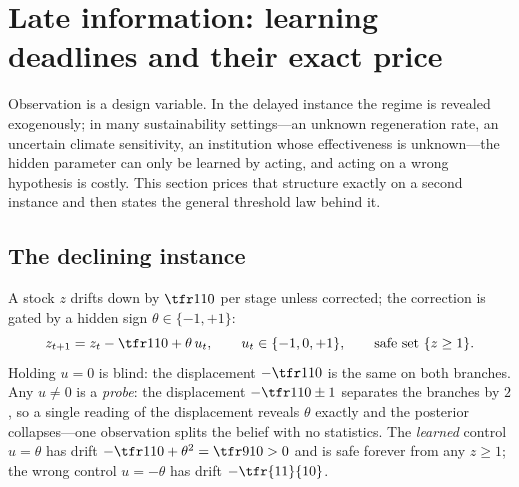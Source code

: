 \section{Late information: learning deadlines and their exact price}\label{sec:deadline}

Observation is a design variable. In the delayed instance the regime is revealed exogenously; in many sustainability settings---an unknown regeneration rate, an uncertain climate sensitivity, an institution whose effectiveness is unknown---the hidden parameter can only be learned by acting, and acting on a wrong hypothesis is costly. This section prices that structure exactly on a second instance and then states the general threshold law behind it.

\subsection{The declining instance}

A stock $z$ drifts down by $\tfr1{10}$ per stage unless corrected; the correction is gated by a hidden sign $\theta\in\{-1,+1\}$:
\begin{equation}\label{eq:declining}
z_{t+1}=z_t-\tfr1{10}+\theta\,u_t,\qquad u_t\in\{-1,0,+1\},\qquad\text{safe set }\{z\ge1\}.
\end{equation}
Holding $u=0$ is blind: the displacement $-\tfr1{10}$ is the same on both branches. Any $u\neq0$ is a \emph{probe}: the displacement $-\tfr1{10}\pm1$ separates the branches by $2$, so a single reading of the displacement reveals $\theta$ exactly and the posterior collapses---one observation splits the belief with no statistics. The \emph{learned} control $u=\theta$ has drift $-\tfr1{10}+\theta^{2}=\tfr9{10}>0$ and is safe forever from any $z\ge1$; the wrong control $u=-\theta$ has drift $-\tfr{11}{10}$.


